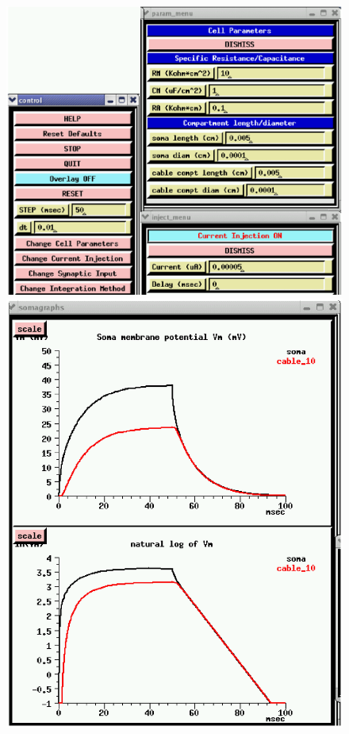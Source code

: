 \documentclass[12pt]{article}
\begin{document}
\begin{figure}[h]
\centering
\begin{minipage}{0.5\textwidth}
 \centerline{\includegraphics[scale=0.38]{figs/cable1-inj5.eps}}
  \end{minipage}
\begin{minipage}{0.45\textwidth}
 \centerline{\includegraphics[scale=0.3]{figs/cable2-inj5.eps}}
  \end{minipage}
  \label{fig:cableinj}
\end{figure}
\end{document}
